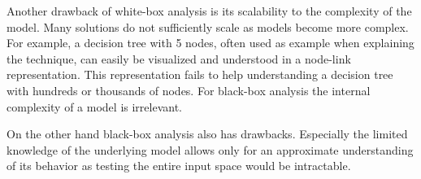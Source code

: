 Another drawback of white-box analysis is its scalability to the complexity of the model. Many solutions do not sufficiently scale as models become more complex. For example, a decision tree with 5 nodes, often used as example when explaining the technique, can easily be visualized and understood in a node-link representation. This representation fails to help understanding a decision tree with hundreds or thousands of nodes. For black-box analysis the internal complexity of a model is irrelevant.

On the other hand black-box analysis also has drawbacks. Especially the limited knowledge of the underlying model allows only for an approximate understanding of its behavior as testing the entire input space would be intractable.